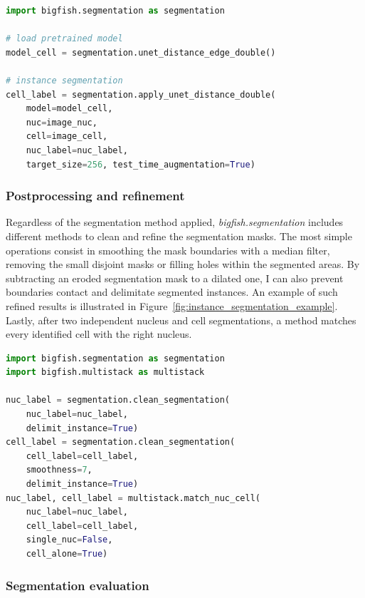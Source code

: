 \begin{minipage}{0.9\textwidth}
\begin{lstlisting}[language=Python]
import bigfish.segmentation as segmentation

# load pretrained model
model_cell = segmentation.unet_distance_edge_double()

# instance segmentation
cell_label = segmentation.apply_unet_distance_double(
    model=model_cell,
    nuc=image_nuc,
    cell=image_cell,
    nuc_label=nuc_label,
    target_size=256, test_time_augmentation=True)
\end{lstlisting}
\end{minipage}

\subsubsection{Postprocessing and refinement}

Regardless of the segmentation method applied, \emph{bigfish.segmentation} includes different methods to clean and refine the segmentation masks.
The most simple operations consist in smoothing the mask boundaries with a median filter, removing the small disjoint masks or filling holes within the segmented areas.
By subtracting an eroded segmentation mask to a dilated one, I can also prevent boundaries contact and delimitate segmented instances.
An example of such refined results is illustrated in Figure~\ref{fig:instance_segmentation_example}.
Lastly, after two independent nucleus and cell segmentations, a method matches every identified cell with the right nucleus.\\

\begin{minipage}{0.9\textwidth}
\begin{lstlisting}[language=Python]
import bigfish.segmentation as segmentation
import bigfish.multistack as multistack

nuc_label = segmentation.clean_segmentation(
	nuc_label=nuc_label,
	delimit_instance=True)
cell_label = segmentation.clean_segmentation(
	cell_label=cell_label,
	smoothness=7,
	delimit_instance=True)
nuc_label, cell_label = multistack.match_nuc_cell(
	nuc_label=nuc_label,
	cell_label=cell_label,
	single_nuc=False,
	cell_alone=True)
\end{lstlisting}
\end{minipage}

\subsubsection{Segmentation evaluation}


